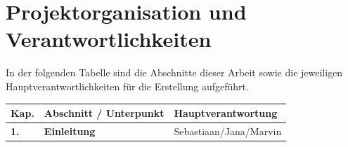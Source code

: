 \section{Projektorganisation und Verantwortlichkeiten}

In der folgenden Tabelle sind die Abschnitte dieser Arbeit sowie die jeweiligen Hauptverantwortlichkeiten für die Erstellung aufgeführt.

\begin{table}[H]
\centering
\begin{tabular}{|p{1.5cm}|p{7.5cm}|p{5cm}|}
\hline
\textbf{Kap.} & \textbf{Abschnitt / Unterpunkt} & \textbf{Hauptverantwortung} \\ \hline
\textbf{1.} & \textbf{Einleitung} & Sebastiaan/Jana/Marvin\\ \hline


\end{tabular}
\end{table}

